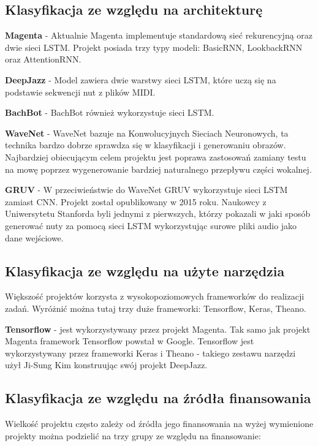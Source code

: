 	\subsection{Klasyfikacja ze względu na architekturę}
	
	\textbf{Magenta} - Aktualnie Magenta implementuje standardową sieć rekurencyjną oraz dwie sieci LSTM. Projekt posiada trzy typy modeli: BasicRNN, LookbackRNN oraz AttentionRNN.
	
	\textbf{DeepJazz} -  Model zawiera dwie warstwy sieci LSTM, które uczą się na podstawie sekwencji nut z plików MIDI.
	
	\textbf{BachBot} - BachBot również wykorzystuje sieci LSTM. 
	 
	\textbf{WaveNet} - WaveNet bazuje na Konwolucyjnych Sieciach Neuronowych, ta technika bardzo dobrze sprawdza się w klasyfikacji i generowaniu obrazów. Najbardziej obiecującym celem projektu jest poprawa zastosowań zamiany testu na mowę poprzez wygenerowanie bardziej naturalnego przepływu części wokalnej.
	
	\textbf{GRUV} -  W przeciwieństwie do WaveNet GRUV wykorzystuje sieci LSTM zamiast CNN. Projekt został opublikowany w 2015 roku. Naukowcy z Uniwersytetu Stanforda byli jednymi z pierwszych, którzy pokazali w jaki sposób generować nuty za pomocą sieci LSTM wykorzystując surowe pliki audio jako dane wejściowe. 
	
	\subsection{Klasyfikacja ze względu na użyte narzędzia}
	Większość projektów korzysta z wysokopoziomowych frameworków do realizacji zadań. Wyróżnić można tutaj trzy duże frameworki: Tensorflow, Keras, Theano. 
	
	 \textbf{Tensorflow} - jest wykorzystywany przez projekt Magenta. Tak samo jak projekt Magenta framework Tensorflow powstał w Google. Tensorflow jest wykorzystywany przez frameworki Keras i Theano - takiego zestawu narzędzi użył Ji-Sung Kim konstruując swój projekt DeepJazz. 
	
	\subsection{Klasyfikacja ze względu na źródła finansowania}
	
	Wielkość projektu często zależy od źródła jego finansowania na wyżej wymienione projekty można podzielić na trzy grupy ze względu na finansowanie:
	
